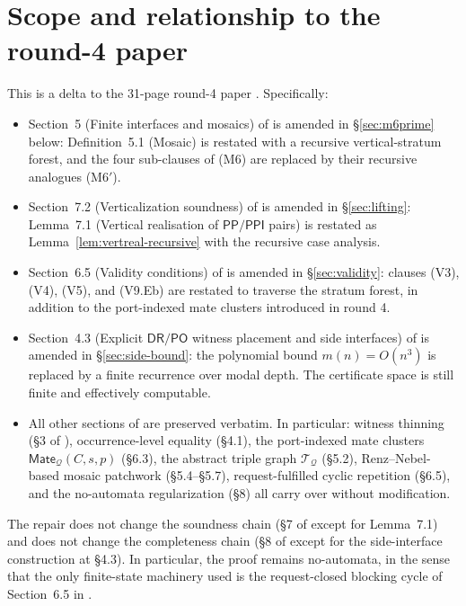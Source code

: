\documentclass[11pt]{article}
\theoremstyle{definition}
\theoremstyle{remark}
\newcommand{\DR}{\mathsf{DR}}
\newcommand{\PO}{\mathsf{PO}}
\newcommand{\PP}{\mathsf{PP}}
\newcommand{\PPI}{\mathsf{PPI}}
\newcommand{\Mate}{\mathsf{Mate}}
\newcommand{\Q}{\mathcal{Q}}
\newcommand{\T}{\mathcal{T}}
\begin{document}
\tableofcontents
\bigskip

\section{Scope and relationship to the round-4 paper}
\label{sec:scope}

This is a delta to the 31-page round-4 paper
\cite{GPT55Repaired}.  Specifically:

\begin{itemize}
\item Section~5 (Finite interfaces and mosaics) of \cite{GPT55Repaired}
  is amended in \S\ref{sec:m6prime} below: Definition~5.1 (Mosaic) is
  restated with a recursive vertical-stratum forest, and the four
  sub-clauses of (M6) are replaced by their recursive analogues
  (M6$'$).
\item Section~7.2 (Verticalization soundness) of \cite{GPT55Repaired}
  is amended in \S\ref{sec:lifting}: Lemma~7.1 (Vertical realisation
  of $\PP/\PPI$ pairs) is restated as Lemma~\ref{lem:vertreal-recursive}
  with the recursive case analysis.
\item Section~6.5 (Validity conditions) of \cite{GPT55Repaired} is
  amended in \S\ref{sec:validity}: clauses (V3), (V4), (V5), and
  (V9.Eb) are restated to traverse the stratum forest, in addition to
  the port-indexed mate clusters introduced in round 4.
\item Section~4.3 (Explicit $\DR/\PO$ witness placement and side
  interfaces) of \cite{GPT55Repaired} is amended in
  \S\ref{sec:side-bound}: the polynomial bound $m(n)=O(n^3)$ is
  replaced by a finite recurrence over modal depth.  The certificate
  space is still finite and effectively computable.
\item All other sections of \cite{GPT55Repaired} are preserved
  verbatim.  In particular: witness thinning (\S3 of
  \cite{GPT55Repaired}), occurrence-level equality (\S4.1), the
  port-indexed mate clusters $\Mate_\Q(C,s,p)$ (\S6.3), the abstract
  triple graph $\T_\Q$ (\S5.2), Renz--Nebel-based mosaic patchwork
  (\S5.4--\S5.7), request-fulfilled cyclic repetition (\S6.5), and the
  no-automata regularization (\S8) all carry over without
  modification.
\end{itemize}

The repair does not change the soundness chain (\S7 of
\cite{GPT55Repaired} except for Lemma~7.1) and does not change the
completeness chain (\S8 of \cite{GPT55Repaired} except for the
side-interface construction at \S4.3).  In particular, the proof
remains no-automata, in the sense that the only finite-state machinery
used is the request-closed blocking cycle of Section~6.5 in
\cite{GPT55Repaired}.
\end{document}
